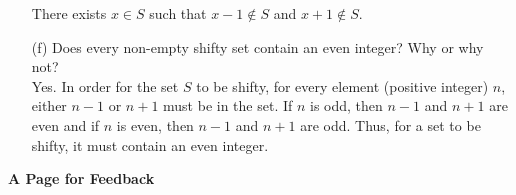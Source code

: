 \documentclass[12pt, a4paper]{article}                  %
\begin{document}
\begin{enumerate}
There exists $x \in S$ such that $x-1 \notin S$ and $x+1 \notin S$.
\\
\item[(f)]
Does every non-empty shifty set contain an even integer? Why or why not?\\

Yes. In order for the set $S$ to be shifty, for every element (positive integer) $n$, either $n - 1$
or $n + 1$ must be in the set. If $n$ is odd, then $n-1$ and $n+1$ are even and if $n$ is even, then
$n-1$ and $n+1$ are odd. Thus, for a set to be shifty, it must contain an even integer.
\end{enumerate}

\newpage
\begin{center}
\LARGE{\textbf{A Page for Feedback}}
\end{center}
\end{document}
